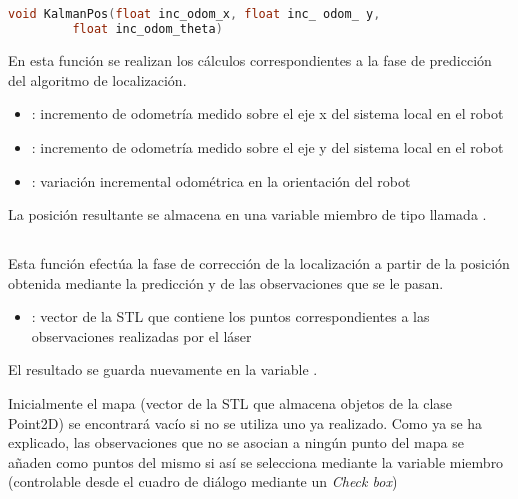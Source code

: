 \subsection{}


\begin{lstlisting}[basicstyle=\small\ttfamily,language=C]
void KalmanPos(float inc_odom_x, float inc_ odom_ y,
         float inc_odom_theta)
\end{lstlisting}

\noindent
En esta función se realizan los cálculos correspondientes a la fase de predicción del algoritmo de localización.

\begin{itemize}
  \item {}: incremento de odometría medido sobre el eje x del sistema local en el robot
  \item {}: incremento de odometría medido sobre el eje y del sistema local en el robot
  \item {}: variación incremental odométrica en la orientación del robot
\end{itemize}

La posición resultante se almacena en una variable miembro de tipo  llamada .

\subsection{}


\noindent
Esta función efectúa la fase de corrección de la localización a partir de la posición obtenida mediante la predicción y de las observaciones que se le pasan.

\begin{itemize}
  \item {}: vector de la STL que contiene los puntos correspondientes a las observaciones realizadas por el láser
\end{itemize}

El resultado se guarda nuevamente en la variable .

Inicialmente el mapa (vector de la STL que almacena objetos de la clase Point2D) se encontrará vacío si no se utiliza uno ya realizado. Como ya se ha explicado, las observaciones que no se asocian a ningún punto del mapa se añaden como puntos del mismo si así se selecciona mediante la variable miembro  (controlable desde el cuadro de diálogo mediante un \emph{Check box})

